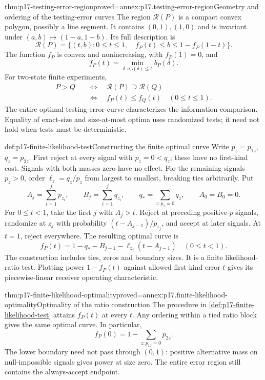 \begin{hbtheorem}{thm:p17-testing-error-region}{proved=annex:p17.testing-error-region}{Geometry and ordering of the testing-error curves}
The region \(\mathcal R(P)\) is a compact convex polygon, possibly a
line segment. It contains \((0,1),(1,0)\) and is invariant under
\((a,b)\mapsto(1-a,1-b)\). Its full description is
\[
 \mathcal R(P)
   =\{(t,b):0\leq t\leq1,\quad f_P(t)\leq b\leq1-f_P(1-t)\}.
\]
The function \(f_P\) is convex and nonincreasing, with \(f_P(1)=0\), and
\[
 f_P(t)=\min_{\delta:a_P(\delta)\leq t}b_P(\delta).
\]
For two-state finite experiments,
\[
 \begin{aligned}
 P>Q
 &\quad\Longleftrightarrow\quad \mathcal R(P)\supseteq\mathcal R(Q)\\
 &\quad\Longleftrightarrow\quad
                   f_P(t)\leq f_Q(t)\quad(0\leq t\leq1).
 \end{aligned}
\]
The entire optimal testing-error curve characterizes the information
comparison. Equality of exact-size and size-at-most optima uses randomized
tests; it need not hold when tests must be deterministic.
\end{hbtheorem}

\begin{hbmethod}{def:p17-finite-likelihood-test}{Constructing the finite optimal curve}
Write \(p_z=p_{1z}\), \(q_z=p_{2z}\). First reject at every signal
with \(p_z=0<q_z\); these have no first-kind cost. Signals with both
masses zero have no effect. For the remaining signals \(p_z>0\), order
\(\ell_z=q_z/p_z\) from largest to smallest, breaking ties arbitrarily.
Put
\[
 A_j=\sum_{i=1}^j p_{z_i},\qquad
 B_j=\sum_{i=1}^j q_{z_i},\qquad
 q_*=\sum_{z:p_z=0}q_z,\qquad A_0=B_0=0.
\]
For \(0\leq t<1\), take the first \(j\) with \(A_j>t\).
Reject at preceding positive-\(p\) signals, randomize at \(z_j\) with
probability \((t-A_{j-1})/p_{z_j}\), and accept at later signals.
At \(t=1\), reject everywhere. The resulting optimal curve is
\[
      f_P(t)=1-q_*-B_{j-1}
                  -\ell_{z_j}(t-A_{j-1})\quad(0\leq t<1).
\]
The construction includes ties, zeros and boundary sizes.
It is a finite likelihood-ratio test. Plotting power \(1-f_P(t)\)
against allowed first-kind error \(t\) gives its piecewise-linear
receiver operating characteristic.
\end{hbmethod}

\begin{hbtheorem}{thm:p17-finite-likelihood-optimality}{proved=annex:p17.finite-likelihood-optimality}{Optimality of the ratio construction}
The procedure in \cref{def:p17-finite-likelihood-test} attains \(f_P(t)\)
at every \(t\). Any ordering within a tied ratio block gives the same
optimal curve. In particular,
\[
             f_P(0)=1-\sum_{z:p_{1z}=0}p_{2z}.
\]
The lower boundary need not pass through \((0,1)\): positive alternative
mass on null-impossible signals gives power at size zero.
The entire error region still contains the always-accept endpoint.
\end{hbtheorem}

